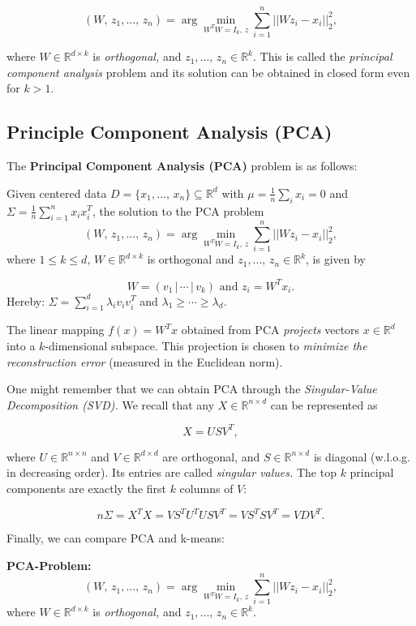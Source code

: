 \documentclass[a4paper]{extarticle}
\begin{document}
\[
    (W, \, z_1,..., \, z_n) = \arg \min_{W^TW = I_k, \, z} \sum_{i = 1}^n ||Wz_i - x_i||_2^2,
\]

where $W \in \mathbb{R}^{d \times k}$ is \textit{orthogonal,} and $z_1,..., \, z_n \in \mathbb{R}^k$. This is called the \textit{principal component analysis} problem and its solution can be obtained in closed form even for $k > 1$.

\subsection{Principle Component Analysis (PCA)}

The \textbf{Principal Component Analysis (PCA)} problem is as follows:

Given centered data $D = \{x_1,..., \, x_n\} \subseteq \mathbb{R}^d$ with $\mu = \frac{1}{n} \sum_i x_i = 0$ and $\Sigma = \frac{1}{n} \sum_{i = 1}^n x_ix_i^T$, the solution to the PCA problem
\[
    (W, \, z_1,..., \, z_n) = \arg \min_{W^TW = I_k, \, z} \sum_{i = 1}^n ||Wz_i - x_i||_2^2,
\]
where $1 \leq k \leq d, \, W \in \mathbb{R}^{d \times k}$ is orthogonal and $z_1,..., \, z_n \in \mathbb{R}^k$, is given by

\[
    W = (v_1 \, | \, \cdots \, | \, v_k) \text{ and } z_i = W^Tx_i.
\]
Hereby: $\Sigma = \sum_{i = 1}^d \lambda_iv_iv_i^T$ and $\lambda_1 \geq \cdots \geq \lambda_d$.

The linear mapping $f(x) = W^Tx$ obtained from PCA \textit{projects} vectors $x \in \mathbb{R}^d$ into a $k$-dimensional subspace. This projection is chosen to \textit{minimize the reconstruction error} (measured in the Euclidean norm).

One might remember that we can obtain PCA through the \textit{Singular-Value Decomposition (SVD).} We recall that any $X \in \mathbb{R}^{n \times d}$ can be represented as

\[
    X = USV^T,
\]

where $U \in \mathbb{R}^{n \times n}$ and $V \in \mathbb{R}^{d \times d}$ are orthogonal, and $S \in \mathbb{R}^{n \times d}$ is diagonal (w.l.o.g. in decreasing order). Its entries are called \textit{singular values.} The top $k$ principal components are exactly the first $k$ columns of $V$:

\[
    n\Sigma = X^TX = VS^TU^TUSV^T = VS^TSV^T = VDV^T.
\]

Finally, we can compare PCA and k-means:

\textbf{PCA-Problem:}
\[
    (W, \, z_1,..., \, z_n) = \arg \min_{W^TW = I_k, \, z} \sum_{i = 1}^n ||Wz_i - x_i||_2^2,
\]
where $W \in \mathbb{R}^{d \times k}$ is \textit{orthogonal,} and $z_1,..., \, z_n \in \mathbb{R}^k$.
\end{document}
